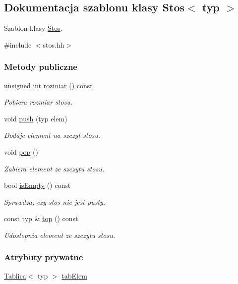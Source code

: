 \hypertarget{class_stos}{\subsection{Dokumentacja szablonu klasy Stos$<$ typ $>$}
\label{class_stos}
}


Szablon klasy \hyperlink{class_stos}{Stos}.  




{\ttfamily \#include $<$stos.\-hh$>$}

\subsubsection*{Metody publiczne}
\begin{DoxyCompactItemize}
\item 
unsigned int \hyperlink{class_stos_a5dc14d56ba947890151e0a11b4e79f3b}{rozmiar} () const 
\begin{DoxyCompactList}\small\item\em Pobiera rozmiar stosu. \end{DoxyCompactList}\item 
void \hyperlink{class_stos_acfb6ff5a1686e362ef8a561067a02475}{push} (typ elem)
\begin{DoxyCompactList}\small\item\em Dodaje element na szczyt stosu. \end{DoxyCompactList}\item 
void \hyperlink{class_stos_a4f780b1f6d4e7db8d5442841bbcaaf8f}{pop} ()
\begin{DoxyCompactList}\small\item\em Zabiera element ze szczytu stosu. \end{DoxyCompactList}\item 
bool \hyperlink{class_stos_ab1b9aac0b31ccbcaec16d14e76597ffd}{is\-Empty} () const 
\begin{DoxyCompactList}\small\item\em Sprawdza, czy stos nie jest pusty. \end{DoxyCompactList}\item 
const typ \& \hyperlink{class_stos_a144c34220bf98ad263b8c1f37681354e}{top} () const 
\begin{DoxyCompactList}\small\item\em Udostepnia element ze szczytu stosu. \end{DoxyCompactList}\end{DoxyCompactItemize}
\subsubsection*{Atrybuty prywatne}
\begin{DoxyCompactItemize}
\item 
\hyperlink{class_tablica}{Tablica}$<$ typ $>$ \hyperlink{class_stos_a8700a1da625f79ed8372b06994a22146}{tab\-Elem}
\end{DoxyCompactItemize}


